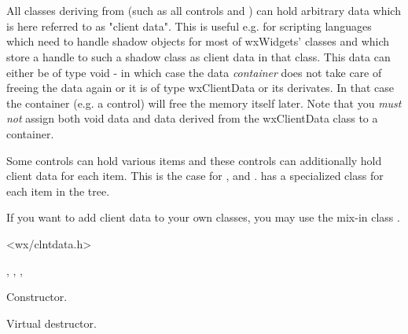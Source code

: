 \section{}\label{wxclientdata}

All classes deriving from 
(such as all controls and )
can hold arbitrary data which is here referred to as "client data".
This is useful e.g. for scripting languages which need to handle
shadow objects for most of wxWidgets' classes and which store
a handle to such a shadow class as client data in that class.
This data can either be of type void - in which case the data
{\it container} does not take care of freeing the data again
or it is of type wxClientData or its derivates. In that case the
container (e.g. a control) will free the memory itself later.
Note that you {\it must not} assign both void data and data
derived from the wxClientData class to a container.

Some controls can hold various items and these controls can
additionally hold client data for each item. This is the case for
, 
and . 
has a specialized class 
for each item in the tree.

If you want to add client data to your own classes, you may
use the mix-in class .


<wx/clntdata.h>


, ,
, 



\label{wxclientdatawxclientdata}


Constructor.

\label{wxclientdatadtor}


Virtual destructor.

\section{}\label{wxclientdatacontainer}

